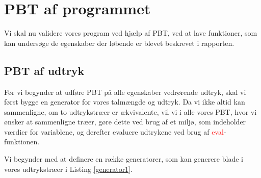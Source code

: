 \section{PBT af programmet}
Vi skal nu validere vores program ved hjælp af PBT, ved at lave funktioner, som kan undersøge de egenskaber der løbende er blevet beskrevet i rapporten. 

\subsection{PBT af udtryk}
Før vi begynder at udføre PBT på alle egenskaber vedrørende udtryk, skal vi først bygge en generator for vores talmængde og udtryk. Da vi ikke altid kan sammenligne, om to udtrykstræer er ækvivalente, vil vi i alle vores PBT, hvor vi ønsker at sammenligne træer, gøre dette ved brug af et miljø, som indeholder værdier for variablene, og derefter evaluere udtrykene ved brug af \textcolor{red}{eval}-funktionen.

Vi begynder med at definere en række generatorer, som kan generere blade i vores udtrykstræer i Listing \ref{generator1}.


